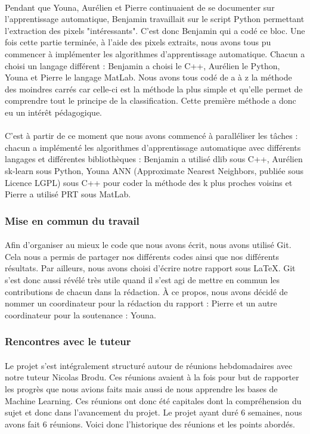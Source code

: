 \documentclass[a4paper,10pt]{report}
\begin{document}
\paragraph{}
Pendant que Youna, Aurélien et Pierre continuaient de se documenter sur l'apprentissage automatique, Benjamin travaillait sur le script Python permettant l'extraction des pixels "intéressants". C'est donc Benjamin qui a codé ce bloc. Une fois cette partie terminée, à l'aide des pixels extraits, nous avons tous pu commencer à implémenter les algorithmes d'apprentissage automatique. Chacun a choisi un langage différent : Benjamin a choisi le C++, Aurélien le Python, Youna et Pierre le langage MatLab. Nous avons tous codé de a à z la méthode des moindres carrés car celle-ci est la méthode la plus simple et qu'elle permet de comprendre tout le principe de la classification. Cette première méthode a donc eu un intérêt pédagogique.
\paragraph{}
C'est à partir de ce moment que nous avons commencé à paralléliser les tâches : chacun a implémenté les algorithmes d'apprentissage automatique avec différents langages et différentes bibliothèques : Benjamin a utilisé dlib sous C++, Aurélien sk-learn sous Python, Youna ANN (Approximate Nearest Neighbors, publiée sous Licence LGPL) sous C++ pour coder la méthode des k plus proches voisins et Pierre a utilisé PRT sous MatLab.
\subsubsection{Mise en commun du travail}
\paragraph{}
Afin d'organiser au mieux le code que nous avons écrit, nous avons utilisé Git. Cela nous a permis de partager nos différents codes ainsi que nos différents résultats. Par ailleurs, nous avons choisi d'écrire notre rapport sous LaTeX. Git s'est donc aussi révélé très utile quand il s'est agi de mettre en commun les contributions de chacun dans la rédaction. À ce propos, nous avons décidé de nommer un coordinateur pour la rédaction du rapport : Pierre et un autre coordinateur pour la soutenance : Youna.
\subsubsection{Rencontres avec le tuteur}
\paragraph{}
Le projet s'est intégralement structuré autour de réunions hebdomadaires avec notre tuteur Nicolas Brodu. Ces réunions avaient à la fois pour but de rapporter les progrès que nous avions faits mais aussi de nous apprendre les bases de Machine Learning. Ces réunions ont donc été capitales dont la compréhension du sujet et donc dans l'avancement du projet. Le projet ayant duré 6 semaines, nous avons fait 6 réunions. Voici donc l'historique des réunions et les points abordés.
\end{document}
